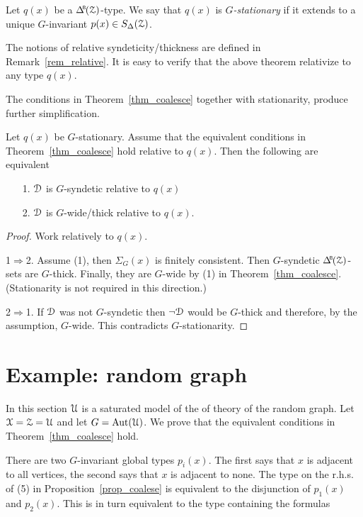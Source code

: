 Let $q(x)$ be a $\BDelta(\Z)$-type.
We say that $q(x)$ is \emph{$G$-stationary\/} if it extends to a unique $G$-in\-var\-iant $p(x)\in S_\Delta(\EuScript Z)$.

The notions of relative syndeticity/thickness are defined in Remark~\ref{rem_relative}.
It is easy to verify that the above theorem relativize to any type $q(x)$.

The conditions in Theorem~\ref{thm_coalesce} together with stationarity, produce further simplification.

\begin{fact}\label{fact_stationarity}
  Let $q(x)$ be $G$-stationary.
  Assume that the equivalent conditions in Theorem~\ref{thm_coalesce} hold relative to $q(x)$.
  Then the following are equivalent
  \begin{itemize}
    \item [1.] $\EuScript D$ is $G$-syndetic relative to $q(x)$
    \item [2.] $\EuScript D$ is $G$-wide/thick relative to $q(x)$.
  \end{itemize}
\end{fact}

\begin{proof}
  Work relatively to $q(x)$.

  1$\Rightarrow$2.
  Assume (1), then $\Sigma_G(x)$ is finitely consistent.
  Then $G$-syndetic $\BDelta({\Z})$-sets are $G$-thick.
  Finally, they are $G$-wide by (1) in Theorem~\ref{thm_coalesce}.
  (Stationarity is not required in this direction.)

  2$\Rightarrow$1.
  If $\EuScript D$ was not $G$-syndetic then $\neg\EuScript D$ would be $G$-thick and therefore, by the assumption, $G$-wide.
  This contradicts $G$-stationarity.
\end{proof}

\section{Example: random graph}

In this section $\EuScript U$ is a saturated model of the of theory of the random graph.
Let $\EuScript X=\EuScript Z=\EuScript U$ and let $G={\rm Aut}(\EuScript U)$.
We prove that the equivalent conditions in Theorem~\ref{thm_coalesce} hold.

There are two $G$-invariant global types $p_i(x)$.
The first says that $x$ is adjacent to all vertices, the second says that $x$ is adjacent to none.
The type on the r.h.s. of (5) in Proposition~\ref{prop_coalese} is equivalent to the disjunction of $p_1(x)$ and $p_2(x)$.
This is in turn equivalent to the type containing the formulas

